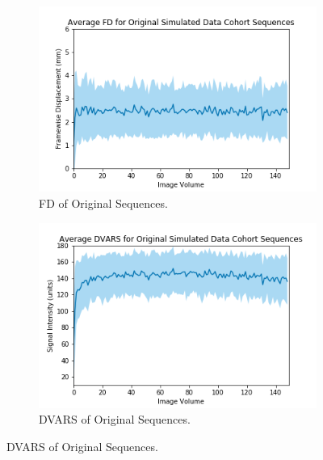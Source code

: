 \begin{figure}
	\centering
	\begin{subfigure}{0.4\textwidth}
		\centering
		\includegraphics[width=1.0\textwidth]{6/figures/spectr-bold-fd-150.png}
		\caption{FD of Original Sequences.}
	\end{subfigure}
	\hspace{0.05\textwidth}
	\begin{subfigure}{0.4\textwidth}
		\centering
		\includegraphics[width=1.0\textwidth]{6/figures/spectr-bold-dvars-150.png}
		\caption{DVARS of Original Sequences.}
	\end{subfigure}
	

\end{figure}
